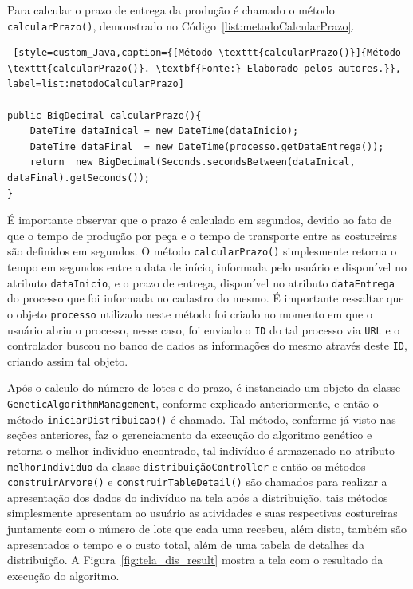 \par Para calcular o prazo de entrega da produção é chamado o método
\texttt{calcularPra\-zo()}, demonstrado no
Código~\ref{list:metodoCalcularPrazo}.

\begin{lstlisting} [style=custom_Java,caption={[Método \texttt{calcularPrazo()}]{Método \texttt{calcularPrazo()}. \textbf{Fonte:} Elaborado pelos autores.}}, label=list:metodoCalcularPrazo] 

public BigDecimal calcularPrazo(){
	DateTime dataInical = new DateTime(dataInicio);
	DateTime dataFinal  = new DateTime(processo.getDataEntrega());
	return  new BigDecimal(Seconds.secondsBetween(dataInical, dataFinal).getSeconds());
}

\end{lstlisting}

\par É importante observar que o prazo é calculado em segundos, devido ao fato de que o tempo de produção por peça e o tempo 
de transporte entre as costureiras são definidos em segundos. O método \texttt{calcularPrazo()} simplesmente retorna o tempo 
em segundos entre a data de início, informada pelo usuário e disponível no atributo \texttt{dataInicio}, e o prazo de entrega, 
disponível no atributo \texttt{dataEntrega} do processo que foi informada no cadastro do mesmo. É importante ressaltar que
o objeto \texttt{processo} utilizado neste método foi criado no momento em que o usuário abriu o processo, nesse caso, foi enviado
o \texttt{ID} do tal processo via \texttt{URL} e o controlador buscou no banco de dados as informações do mesmo através deste \texttt{ID}, criando assim tal objeto.

\par Após o calculo do número de lotes e do prazo, é instanciado um objeto da classe 
\texttt{GeneticAlgorithmManagement}, conforme explicado anteriormente, e então o método 
\texttt{inici\-arDistribuicao()} é chamado. Tal método, conforme já visto nas seções anteriores,
faz o gerenciamento da execução do algoritmo genético e retorna o melhor indivíduo encontrado, tal indivíduo é armazenado no 
atributo \texttt{melhorIndividuo} da classe \texttt{distribuiçãoController} e então os métodos \texttt{construirArvore()} e
\texttt{construir\-TableDetail()} são chamados para realizar a apresentação dos
dados do indivíduo na tela após a distribuição, tais métodos simplesmente apresentam ao usuário as atividades e suas respectivas costureiras juntamente com o número de lote que cada uma recebeu, além disto, também são apresentados o tempo e o custo total, além de uma tabela de detalhes da distribuição.
A Figura~\ref{fig:tela_dis_result} mostra a tela com o resultado da execução do algoritmo.

